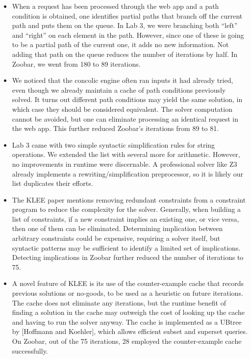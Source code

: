 \documentclass{scrartcl}
\begin{document}
\begin{itemize}
\item When a request has been processed through the web app and a path
condition is obtained, one identifies partial paths that branch off the
current path and puts them on the queue. In Lab 3, we were branching
both ``left'' and ``right'' on each element in the path. However, since
one of these is going to be a partial path of the current one, it adds
no new information. Not adding that path on the queue reduces the number
of iterations by half. In Zoobar, we went from 180 to 89 iterations.

\item We noticed that the concolic engine often ran inputs it had
already tried, even though we already maintain a cache of path
conditions previously solved. It turns out different path conditions
may yield the same solution, in which case they should be considered
equivalent. The solver computation cannot be avoided, but one can
eliminate processing an identical request in the web app. This further
reduced Zoobar's iterations from 89 to 81.

\item Lab 3 came with two simple syntactic simplification rules for
string operations. We extended the list with several more for
arithmetic. However, no improvements in runtime were discernable.
A professional solver like Z3 already implements a
rewriting/simplification preprocessor, so it is likely our list
duplicates their efforts.

\item The KLEE paper mentions removing redundant constraints from a
constraint program to reduce the complexity for the solver. Generally,
when building a list of constraints, if a new constraint implies an
existing one, or vice versa, then one of them can be eliminated.
Determining implication between arbitrary constraints could be expensive,
requiring a solver itself, but syntactic patterns may be sufficient to
identify a limited set of implications. Detecting implications in Zoobar
further reduced the number of iterations to 75.

\item A novel feature of KLEE is its use of the counter-example cache
that records previous solutions or no-goods, to be used as a heuristic
on future iterations. The cache does not eliminate any iterations, but
the runtime benefit of finding a solution in the cache may outweigh the
cost of looking up the cache and having to run the solver anyway.
The cache is implemented as a UBtree by [Hoffmann and Koehler],
which allows efficient subset and superset queries. On Zoobar, out of
the 75 iterations, 28 employed the counter-example cache successfully.
\end{itemize}
\end{document}
